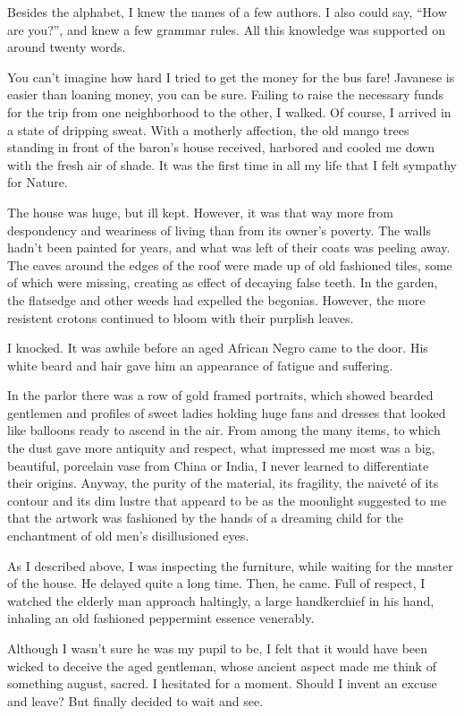 \documentclass[a4paper,12pt]{book}
\begin{document}
Besides the alphabet, I knew the names
of a few authors. I also could say, ``How are
you?'', and knew a few grammar rules.
All this knowledge was supported
on around twenty words.

You can't imagine how hard I tried
to get the money for the bus fare! Javanese
is easier than loaning money,
you can be sure. Failing to raise
the necessary funds for the trip from
one neighborhood to the other, I walked.
Of course, I arrived in a state of dripping sweat.
With a motherly
affection, the old
mango trees standing in front
of the baron's house received, harbored
and cooled me down with the fresh air of shade.
It was the first time in all my life
that I felt sympathy for Nature.

The house was huge, but ill kept.
However, it was that way more from
despondency and weariness of living
than from its owner's poverty.
The walls hadn't been
painted for years, and what was left
of their coats was peeling away.
The eaves around the edges of the
roof were made up of old fashioned tiles,
some of which were missing, creating
as effect of decaying false teeth.
In the garden, the
flatsedge and other weeds had expelled the 
begonias. However, the more resistent crotons
continued to bloom with their purplish leaves.

I knocked. It was awhile before 
an aged African Negro came to the door. His white
beard and hair gave him an appearance of
fatigue and suffering.

In the parlor there was a row of gold framed portraits,
which showed bearded gentlemen and profiles of
sweet ladies holding huge fans and dresses
that looked like balloons ready to ascend in the air.
From among the many items,
to which the dust gave more antiquity and respect,
what impressed me most was a big, beautiful,
porcelain vase from China or India, I never
learned to differentiate their origins.
Anyway, the purity of the material,
its fragility, the naiveté of its contour
and its dim lustre that appeard to be
as the moonlight suggested to me that
the artwork was fashioned by the hands
of a dreaming child for
the enchantment of old men's  disillusioned eyes.

As I described above, I was inspecting the furniture,
while waiting for the master of the house.
He delayed quite a long time. Then, he came.
Full of respect, I watched the elderly man
approach haltingly,
a large handkerchief in his
hand, inhaling an old fashioned peppermint
essence venerably.

Although I wasn't sure he was my pupil to be, I felt
that it would have been wicked to deceive the
aged gentleman, whose ancient aspect made
me think of something august, sacred.
I hesitated for a moment. Should I invent
an excuse and leave? But finally
decided to wait and see.
\end{document}
